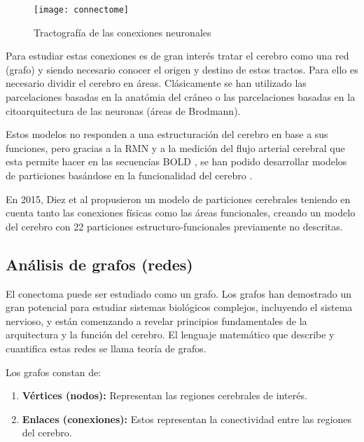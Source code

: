 \documentclass[fleqn,10pt]{UICArticle} %
\begin{document}
\begin{figure}[ht]
	\centering
	\texttt{[image: connectome]}
	\caption{Tractografía de las conexiones neuronales}
	\label{fig:connectome}
\end{figure}

Para estudiar estas conexiones es de gran interés tratar el cerebro como una red (grafo) y siendo necesario conocer el origen y destino de estos tractos. Para ello es necesario dividir el cerebro en áreas. Clásicamente se han utilizado las parcelaciones basadas en la anatómia del cráneo o las parcelaciones basadas en la citoarquitectura de las neuronas (áreas de Brodmann).

Estos modelos no responden a una estructuración del cerebro en base a sus funciones, pero gracias a la RMN y a la medición del flujo arterial cerebral que esta permite hacer en las secuencias BOLD \cite{Ogawa1990}, se han podido desarrollar modelos de particiones basándose en la funcionalidad del cerebro \cite{Heller2006}.

En 2015, Diez et al \cite{Diez2015} propusieron un modelo de particiones cerebrales teniendo en cuenta tanto las conexiones físicas como las áreas funcionales, creando un modelo del cerebro con 22 particiones estructuro-funcionales previamente no descritas.



\subsection{Análisis de grafos (redes)}


 El conectoma puede ser estudiado como un grafo. Los grafos han demostrado un gran potencial para estudiar sistemas biológicos complejos, incluyendo el sistema nervioso, y están comenzando a revelar principios fundamentales de la arquitectura y la función del cerebro. El lenguaje matemático que describe y cuantifica estas redes se llama teoría de grafos.
 
\vspace{5mm} 
Los grafos constan de:
\begin{enumerate}[noitemsep]
\item \textbf{Vértices (nodos):} Representan las regiones cerebrales de interés.
\item \textbf{Enlaces (conexiones):} Estos representan la conectividad entre las regiones del cerebro.
\end{enumerate}
\end{document}
